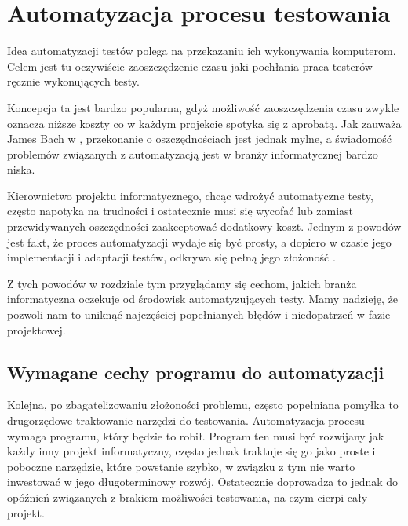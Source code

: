 \documentclass[00-praca-magisterska.tex]{subfiles}
\begin{document}
\chapter{Automatyzacja procesu testowania}
\label{automatyzacja}

Idea automatyzacji testów polega na przekazaniu ich wykonywania komputerom.
Celem jest tu oczywiście zaoszczędzenie czasu jaki pochłania praca testerów
ręcznie wykonujących testy.

Koncepcja ta jest bardzo popularna, gdyż możliwość zaoszczędzenia czasu zwykle
oznacza niższe koszty co w każdym projekcie spotyka się z aprobatą. Jak zauważa
James Bach w \cite{snake-oil}, przekonanie o oszczędnościach jest jednak mylne,
a świadomość problemów związanych z automatyzacją jest w branży informatycznej
bardzo niska.

Kierownictwo projektu informatycznego, chcąc wdrożyć automatyczne testy, często
napotyka na trudności i ostatecznie musi się wycofać lub zamiast przewidywanych
oszczędności zaakceptować dodatkowy koszt. Jednym z powodów jest fakt, że
proces automatyzacji wydaje się być prosty, a dopiero w czasie jego
implementacji i adaptacji testów, odkrywa się pełną jego złożoność
\cite{automation-fail}.

Z tych powodów w rozdziale tym przyglądamy się cechom, jakich branża
informatyczna oczekuje od środowisk automatyzujących testy. Mamy nadzieję, że
pozwoli nam to uniknąć najczęściej popełnianych błędów i niedopatrzeń w fazie
projektowej.

\section{Wymagane cechy programu do automatyzacji}
\label{cechy-programu-do-automatyzacji}

Kolejna, po zbagatelizowaniu złożoności problemu, często popełniana pomyłka to
drugorzędowe traktowanie narzędzi do testowania. Automatyzacja procesu wymaga
programu, który będzie to robił.  Program ten musi być rozwijany jak każdy inny
projekt informatyczny, często jednak traktuje się go jako proste i poboczne
narzędzie, które powstanie szybko, w związku z tym nie warto inwestować w jego
długoterminowy rozwój.  Ostatecznie doprowadza to jednak do opóźnień związanych
z brakiem możliwości testowania, na czym cierpi cały projekt.  
\end{document}
